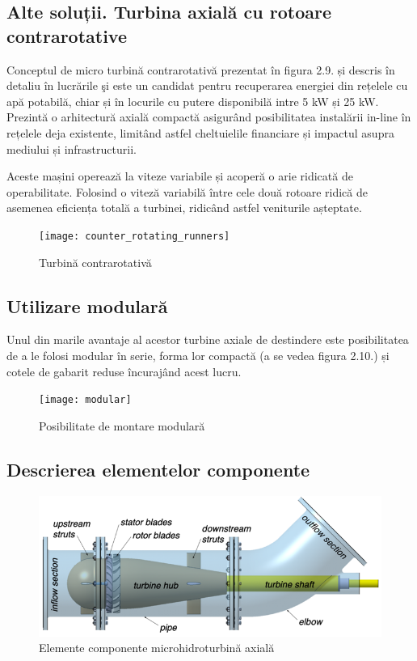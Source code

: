 \subsection{Alte soluții. Turbina axială cu rotoare contrarotative}

Conceptul de micro turbină contrarotativă prezentat în figura 2.9. și descris în detaliu în lucrările \cite{andolfatto2016simulation} \c{s}i \cite{andolfatto2015mixed} este un candidat pentru recuperarea energiei din rețelele cu apă potabilă, chiar și în locurile cu putere disponibilă intre 5 kW și 25 kW. Prezintă o arhitectură axială compactă asigurând posibilitatea instalării in-line în rețelele deja existente, limitând astfel cheltuielile financiare și impactul asupra mediului și infrastructurii.

Aceste mașini operează la viteze variabile și acoperă o arie ridicată de operabilitate. Folosind o viteză variabilă între cele două rotoare ridică de asemenea eficiența totală a turbinei, ridicând astfel veniturile așteptate.

\begin{figure}[h!]
	\centering
	\texttt{[image: counter\_rotating\_runners]}
	\caption{Turbină contrarotativă \protect\cite{andolfatto2016simulation}}
	\label{Turbină contrarotativă}
\end{figure}

\clearpage


\subsection{Utilizare modulară}
Unul din marile avantaje al acestor turbine axiale de destindere este posibilitatea de a le folosi modular în serie, forma lor compactă (a se vedea figura 2.10.) și cotele de gabarit reduse încurajând acest lucru.

\begin{figure}[h!]
	\centering
	\texttt{[image: modular]}
	\caption{Posibilitate de montare modulară \protect\cite{hasmatuchi2014new}}
	\label{Posibilitate de montare modulară}
\end{figure}

\subsection{Descrierea elementelor componente}

\begin{figure}[h!]
	\centering
	\includegraphics[scale=0.7]{figures/assy-marked.png}
	\caption{Elemente componente microhidroturbină axială}
	\label{Elemente componente microhidroturbină axială}
\end{figure}


